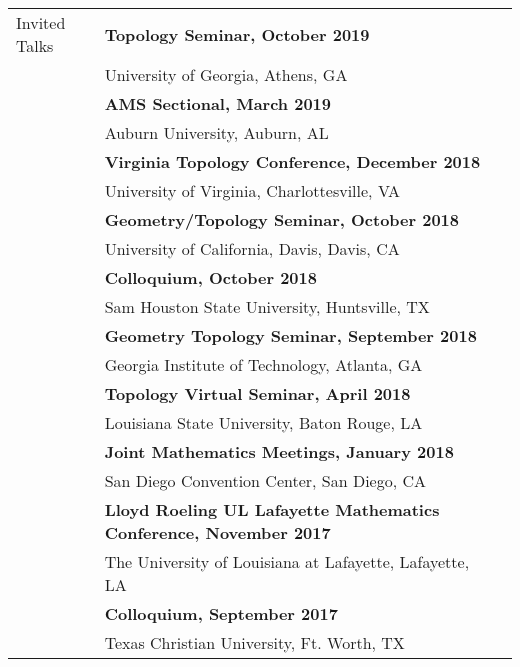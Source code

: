 \documentclass[letterpaper,11pt,oneside]{article}
\begin{document}
          \noindent \begin{tabular}{@{} l l l} 
       \Large{Invited Talks} 
       
            & \textbf{Topology Seminar, October 2019} \\
     & University of Georgia, Athens, GA\\
     
     
              & \textbf{AMS Sectional, March 2019} \\
     & Auburn University, Auburn, AL\\
  
       
        & \textbf{Virginia Topology Conference, December 2018} \\
     & University of Virginia, Charlottesville, VA\\
     
              
       
       & \textbf{Geometry/Topology Seminar, October 2018} \\
     & University of California, Davis, Davis, CA\\
     

     
        & \textbf{Colloquium, October 2018 } \\
     & Sam Houston State University, Huntsville, TX\\
 
       & \textbf{Geometry Topology Seminar, September 2018} \\
     & Georgia Institute of Technology, Atlanta, GA\\

       & \textbf{Topology Virtual Seminar, April 2018 } \\
     & Louisiana State University, Baton Rouge, LA\\
     
   


     &\textbf{Joint Mathematics Meetings, January 2018} \\
     &  San Diego Convention Center, San Diego, CA\\

     &\textbf{Lloyd Roeling UL Lafayette Mathematics Conference, November 2017} \\
     &  The University of Louisiana at Lafayette, Lafayette, LA \\

    
     &\textbf{Colloquium, September 2017} \\
     & Texas Christian University, Ft. Worth, TX \\
 

\end{tabular}
\end{document}
